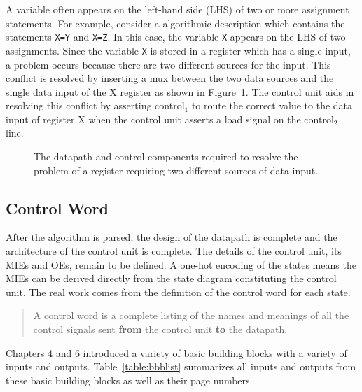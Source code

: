 \begin{description}
A variable often appears on the left-hand side (LHS) 
of two or more assignment statements.  For example, consider a
algorithmic description which contains the statements \verb+X=Y+ 
and \verb+X=Z+.  In this case, the variable \verb^X^ appears on the LHS
of two assignments.  Since the variable \verb^X^ is stored in a register
which has a single input, a problem occurs because there are two 
different sources for the input.  This conflict is resolved by
inserting a mux between the two data sources and the single
data input of the X register as shown in Figure~\ref{fig:datapathControl2Source}.
The control unit aids in resolving this conflict by asserting 
control$_1$ to route the correct value to the data input of 
register X when the control unit asserts a load signal on the 
control$_2$ line.

\begin{figure}[ht]
\caption{The datapath and control components required to resolve
the problem of a register requiring two different sources of
data input.}
\label{fig:datapathControl2Source}
\end{figure}

\end{description}


\subsection{Control Word}
After the algorithm is parsed, the design of the datapath is complete
and the architecture of the control unit is complete.  The details of 
the control unit, its MIEs and OEs, remain to be defined.  A 
one-hot encoding of the states means the MIEs can be derived directly
from the state diagram constituting the control unit.  The real work
comes from the definition of the control word for each state.

\begin{quote}
A control word is a complete listing of the names and meanings of 
all the control signals sent \textbf{ from} the control unit \textbf{ to} the
datapath.  
\end{quote}

Chapters 4 and 6 introduced a variety of basic building
blocks with a variety of inputs and outputs.  Table~\ref{table:bbblist}
summarizes all inputs and outputs from these basic building blocks
as well as their page numbers.

